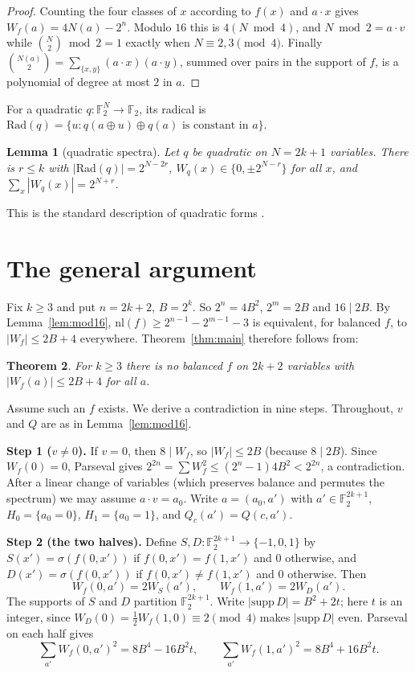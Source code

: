 \documentclass[11pt]{amsart}
\newtheorem{theorem}{Theorem}
\newtheorem{lemma}[theorem]{Lemma}
\theoremstyle{remark}
\newcommand{\F}{\mathbb{F}_2}
\newcommand{\W}{W}
\newcommand{\nl}{\mathrm{nl}}
\newcommand{\sg}{\sigma}
\newcommand{\Rad}{\mathrm{Rad}}
\begin{document}
\begin{proof}
Counting the four classes of $x$ according to $f(x)$ and $a\cdot x$ gives
$\W_f(a)=4N(a)-2^n$. Modulo $16$ this is $4(N\bmod 4)$, and $N\bmod 2=a\cdot v$ while
$\binom N2\bmod 2=1$ exactly when $N\equiv 2,3\pmod 4$. Finally
$\binom{N(a)}2=\sum_{\{x,y\}}(a\cdot x)(a\cdot y)$, summed over pairs in the support of
$f$, is a polynomial of degree at most $2$ in $a$.
\end{proof}

For a quadratic $q:\F^N\to\F$, its radical is
$\Rad(q)=\{u: q(a\oplus u)\oplus q(a)\text{ is constant in }a\}$.

\begin{lemma}[quadratic spectra]\label{lem:quad}
Let $q$ be quadratic on $N=2k+1$ variables. There is $r\le k$ with $|\Rad(q)|=2^{N-2r}$,
$\W_q(x)\in\{0,\pm 2^{N-r}\}$ for all $x$, and $\sum_x|\W_q(x)|=2^{N+r}$.
\end{lemma}

This is the standard description of quadratic forms \cite[Ch.~5]{Carlet21}.

\section{The general argument}\label{sec:main}

Fix $k\ge 3$ and put $n=2k+2$, $B=2^k$. So $2^n=4B^2$, $2^{m}=2B$ and $16\mid 2B$.
By Lemma~\ref{lem:mod16}, $\nl(f)\ge 2^{n-1}-2^{m-1}-3$ is equivalent, for balanced $f$, to
$|\W_f|\le 2B+4$ everywhere. Theorem~\ref{thm:main} therefore follows from:

\begin{theorem}\label{thm:walsh}
For $k\ge 3$ there is no balanced $f$ on $2k+2$ variables with $|\W_f(a)|\le 2B+4$ for all $a$.
\end{theorem}

Assume such an $f$ exists. We derive a contradiction in nine steps. Throughout, $v$ and $Q$
are as in Lemma~\ref{lem:mod16}.

\smallskip\noindent\textbf{Step 1 ($v\neq0$).}
If $v=0$, then $8\mid \W_f$, so $|\W_f|\le 2B$ (because $8\mid 2B$). Since $\W_f(0)=0$,
Parseval gives $2^{2n}=\sum\W_f^2\le(2^n-1)4B^2<2^{2n}$, a contradiction. After a linear change of
variables (which preserves balance and permutes the spectrum) we may assume $a\cdot v=a_0$.
Write $a=(a_0,a')$ with $a'\in\F^{2k+1}$, $H_0=\{a_0=0\}$, $H_1=\{a_0=1\}$, and
$Q_c(a')=Q(c,a')$.

\smallskip\noindent\textbf{Step 2 (the two halves).}
Define $S,D:\F^{2k+1}\to\{-1,0,1\}$ by $S(x')=\sg(f(0,x'))$ if $f(0,x')=f(1,x')$ and $0$
otherwise, and $D(x')=\sg(f(0,x'))$ if $f(0,x')\ne f(1,x')$ and $0$ otherwise. Then
\[
  \W_f(0,a')=2\W_S(a'),\qquad \W_f(1,a')=2\W_D(a').
\]
The supports of $S$ and $D$ partition $\F^{2k+1}$. Write $|\mathrm{supp}\,D|=B^2+2t$; here $t$ is
an integer, since $\W_D(0)=\tfrac12\W_f(1,0)\equiv 2\pmod 4$ makes $|\mathrm{supp}\,D|$ even.
Parseval on each half gives
\[
  \sum_{a'}\W_f(0,a')^2=8B^4-16B^2t,\qquad \sum_{a'}\W_f(1,a')^2=8B^4+16B^2t .
\]
\end{document}
